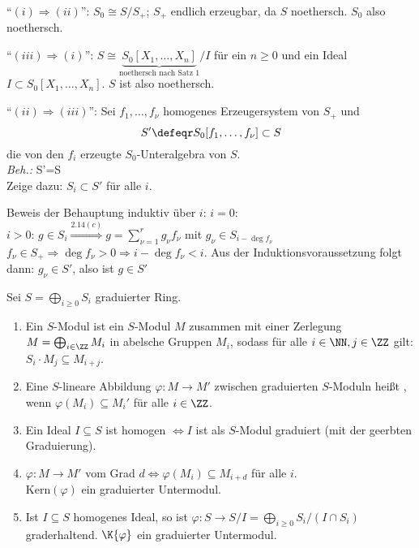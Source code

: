 \begin{Bew}
``$(i)\Rightarrow (ii)$'': $S_0\cong S/S_{+}$; $S_{+}$ endlich erzeugbar, da $S$ noethersch.
$S_0$ also noethersch.

``$(iii)\Rightarrow (i)$'': $S\cong \underbrace{S_0[X_1, \ldots, X_n]}_
{\text{noethersch nach Satz 1}}/I$ f\"ur ein $n\geq 0$
und ein Ideal $I\subset S_0[X_1, \ldots, X_n]$. $S$ ist also noethersch.

``$(ii)\Rightarrow (iii)$'': Sei $f_1, \ldots, f_\nu$ homogenes Erzeugersystem
von $S_+$ und  
\[
S'\defeqr S_0[f_1, \ldots, f_\nu]\subset S
\]
die von den $f_i$ erzeugte
$S_0$-Unteralgebra von $S$.\\
\emph{Beh.:} S'=S\\
Zeige dazu: $S_i\subset S'$ f\"ur alle $i$.

Beweis der Behauptung induktiv \"uber $i$:
$i=0$: \chk\\
$i> 0$: $g\in S_i\stackrel{2.14(c)}{\Rightarrow}g=\sum_{\nu=1}^{r} g_{\nu}f_\nu$ mit
$g_\nu\in S_{i-\deg{f_\nu}}$\\
$f_\nu\in S_{+} \Rightarrow \deg{f_\nu}> 0 \Rightarrow i-\deg{f_\nu} < i$.
Aus der Induktionsvoraussetzung folgt dann: $g_\nu\in S'$, also ist $g\in S'$
\end{Bew}

\begin{DefBem}
\label{2.16} Sei $S=\bigoplus_{i\geq 0}S_i$ graduierter Ring.
\begin{enumerate}

\item Ein  $S$-Modul ist ein $S$-Modul $M$ zusammen mit
einer Zerlegung $M=\bigoplus_{i\in\ZZ} M_i$ in abelsche Gruppen $M_i$,
sodass f\"ur alle $i\in\NN, j\in\ZZ$  gilt:
$S_i\cdot M_j\subseteq M_{i+j}$.

\item Eine $S$-lineare Abbildung $\varphi:M\to M'$ zwischen graduierten $S$-Moduln
hei\ss t , wenn $\varphi(M_i)\subseteq
M_i'$ f\"ur alle $i\in \ZZ$.

\item Ein Ideal $I\subseteq S$ ist homogen $\Leftrightarrow I$ ist als $S$-Modul
graduiert (mit der geerbten Graduierung).

\item $\varphi: M \to M'$ vom Grad $d \Leftrightarrow \varphi(M_i) \subseteq
      M_{i+d}$ für alle $i$.\\
      Kern$(\varphi)$ ein graduierter Untermodul.
      
\item Ist $I \subseteq S$ homogenes Ideal, so ist $\varphi: S \to S/I =
\bigoplus_{i \ge
0} S_i/(I \cap S_i)$ graderhaltend. $\K{\varphi}$ ein graduierter Untermodul.
\end{enumerate}
\end{DefBem}

